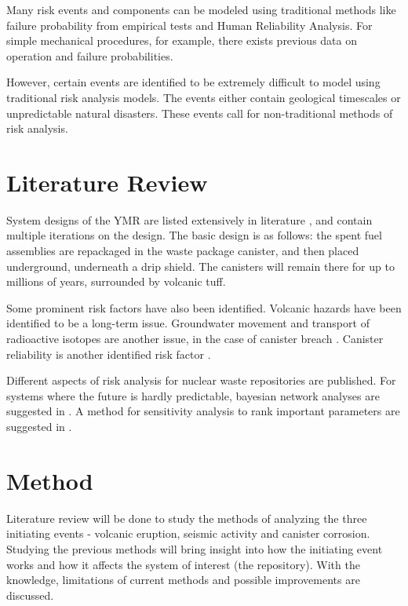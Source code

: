 \documentclass[12pt]{article}
\begin{document}
Many risk events and components can be modeled using traditional methods like
failure probability from empirical tests and Human Reliability Analysis.
For simple mechanical procedures, for example, there exists previous data
on operation and failure probabilities. 

However, certain events are identified to be extremely difficult
to model using traditional risk analysis models. The events either
contain geological timescales or unpredictable natural disasters.
These events call for non-traditional methods of risk analysis.


\section{Literature Review}
System designs of the \gls{YMR} are listed extensively in literature \cite{u.s._department_of_energy_office_of_civilian_radioactive_waste_management_national_2008, wilson_total-system_1994, rechard_evolution_2014, u.s._department_of_energy_yucca_2002}, and contain multiple
iterations on the design. The basic design is as follows: the spent fuel assemblies
are repackaged in the waste package canister, and then placed underground,
underneath a drip shield. The canisters will remain there for up to millions of years,
surrounded by volcanic tuff.

Some prominent risk factors have also been identified. Volcanic hazards \cite{ho_risk_1992, smith_area_1990}
have been identified to be a long-term issue. Groundwater movement and transport of 
radioactive isotopes are another issue, in the case of canister breach \cite{robison_ground-water_1984, quade_fossil_1995}.  Canister reliability is another
identified risk factor \cite{whipple_can_1996, rutqvist_analysis_2003}.

Different aspects of risk analysis for nuclear waste repositories are published.
For systems where the future is hardly predictable, bayesian network analyses are 
suggested in \cite{lee_application_2006}. A method for sensitivity analysis
to rank important parameters are suggested in \cite{mohanty_cdf_2001}.


\section{Method}

Literature review will be done to study the methods of analyzing the three
initiating events - volcanic eruption, seismic activity and canister
corrosion. Studying the previous methods will bring insight into how
the initiating event works and how it affects the system of
interest (the repository). With the knowledge, limitations of
current methods and possible improvements are discussed.
\end{document}
